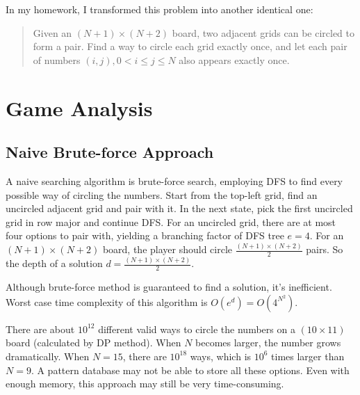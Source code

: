 \documentclass[12pt]{article}
\begin{document}
In my homework, I transformed this problem into another identical one:
\begin{quote}
Given an $(N+1)\times(N+2)$ board, two adjacent grids can be circled to form a pair. Find a way to circle each grid exactly once, and let each pair of numbers $(i,j), 0<i\leq j\leq N$ also appears exactly once.
\end{quote}

 
\section{Game Analysis}
\subsection*{Naive Brute-force Approach}
A naive searching algorithm is brute-force search, employing DFS to find every possible way of circling the numbers. Start from the top-left grid, find an uncircled adjacent grid and pair with it. In the next state, pick the first uncircled grid in row major and continue DFS. For an uncircled grid, there are at most four options to pair with, yielding a  branching factor of DFS tree $e=4$. For an $(N+1)\times(N+2)$ board, the player should circle $	\frac{(N+1)\times(N+2)}{2}$ pairs. So the depth of a solution $d=\frac{(N+1)\times(N+2)}{2}$.

Although brute-force method is guaranteed to find a solution, it's inefficient. Worst case time complexity of this algorithm is $O(e^d) = O(4^{N^2})$.

There are about $10^{12}$ different valid ways to circle the numbers on a $(10\times11)$ board (calculated by DP method). When $N$ becomes larger, the number grows dramatically. When $N=15$, there are $10^{18}$ ways, which is $10^6$ times larger than $N=9$. A pattern database may not be able to store all these options. Even with enough memory, this approach may still be very time-consuming. 	
\end{document}
